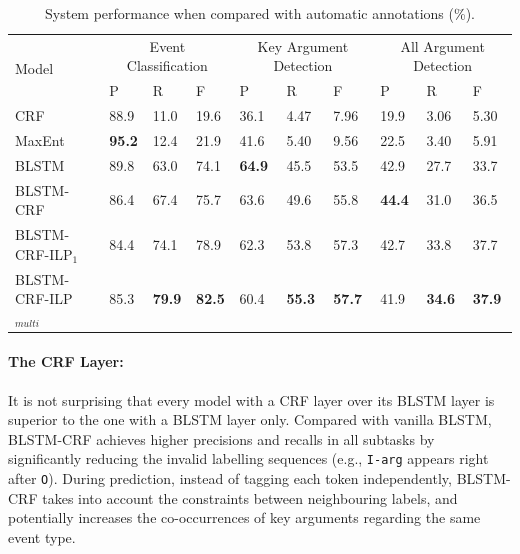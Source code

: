 \begin{table}[!t]
\centering
\small
\begin{tabular}{|l|p{}<{\centering}|p{}<{\centering}|p{}<{\centering}|p{}<{\centering}|p{}<{\centering}|p{}<{\centering}|p{}<{\centering}|p{}<{\centering}|p{}<{\centering}|} \hline
	\multirow{2}{*}{Model} & \multicolumn{3}{c|}{Event Classification} & \multicolumn{3}{c|}{Key Argument Detection} &
	\multicolumn{3}{c|}{All Argument Detection} \\ \cline{2-10}
	 & P & R & F & P & R & F & P & R & F \\ \hline
	CRF & 88.9 & 11.0 & 19.6 & 36.1 & 4.47 & 7.96 & 19.9 & 3.06 & 5.30  \\ \hline
	MaxEnt & \textbf{95.2} & 12.4 & 21.9 & 41.6 & 5.40 & 9.56 & 22.5 & 3.40 & 5.91 \\ \hline
	BLSTM & 89.8 & 63.0 & 74.1 & \textbf{64.9} & 45.5 & 53.5 & 42.9 & 27.7 & 33.7  \\ \hline \hline
	BLSTM-CRF & 86.4 & 67.4 & 75.7 & 63.6 & 49.6 & 55.8 & \textbf{44.4} & 31.0 & 36.5  \\ \hline
	BLSTM-CRF-ILP$_{1}$ & 84.4 & 74.1 & 78.9 & 62.3 & 53.8 & 57.3 & 42.7 & 33.8 & 37.7 \\ \hline
	BLSTM-CRF-ILP$_{multi}$ & 85.3 & \textbf{79.9} & \textbf{82.5} & 60.4 & \textbf{55.3} & \textbf{57.7} & 41.9 & \textbf{34.6} & \textbf{37.9} \\ \hline
\end{tabular}
\caption{System performance when compared with automatic annotations (\%).  \label{tab:1}}
\end{table}


\paragraph{The CRF Layer:}
It is not surprising that  every model with a CRF layer over its BLSTM layer is superior to the one with a BLSTM layer only. Compared with vanilla BLSTM, BLSTM-CRF achieves higher precisions and recalls in all subtasks by significantly reducing the invalid labelling sequences (e.g., \texttt{I-arg} appears right after \texttt{O}). During prediction, instead of tagging each token independently, BLSTM-CRF takes into account the constraints between neighbouring labels, and potentially increases the co-occurrences of key arguments regarding the same event type. %

